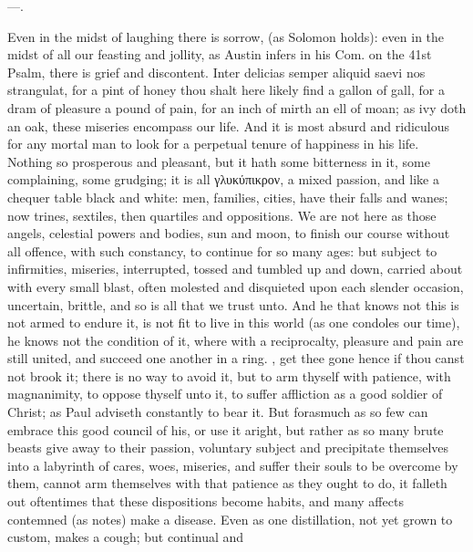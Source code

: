 {---.

Even in the midst of laughing there is sorrow, (as Solomon holds):
even in the midst of all our feasting and jollity, as Austin
infers in his Com. on the 41st Psalm, there is grief and discontent.
Inter delicias semper aliquid saevi nos strangulat, for a pint of honey
thou shalt here likely find a gallon of gall, for a dram of pleasure a
pound of pain, for an inch of mirth an ell of moan; as ivy doth an oak,
these miseries encompass our life. And it is most absurd and ridiculous
for any mortal man to look for a perpetual tenure of happiness in his
life. Nothing so prosperous and pleasant, but it hath some
bitterness in it, some complaining, some grudging; it is all
\textgreek{γλυκύπικρον}, a mixed passion, and like a chequer table black and white:
men, families, cities, have their falls and wanes; now trines,
sextiles, then quartiles and oppositions. We are not here as those
angels, celestial powers and bodies, sun and moon, to finish our course
without all offence, with such constancy, to continue for so many ages:
but subject to infirmities, miseries, interrupted, tossed and tumbled
up and down, carried about with every small blast, often molested and
disquieted upon each slender occasion, uncertain, brittle, and so
is all that we trust unto.  And he that knows not this is not
armed to endure it, is not fit to live in this world (as one condoles
our time), he knows not the condition of it, where with a reciprocalty,
pleasure and pain are still united, and succeed one another in a ring.
, get thee gone hence if thou canst not brook it; there is
no way to avoid it, but to arm thyself with patience, with magnanimity,
to oppose thyself unto it, to suffer affliction as a good soldier
of Christ; as Paul adviseth constantly to bear it. But forasmuch
as so few can embrace this good council of his, or use it aright, but
rather as so many brute beasts give away to their passion, voluntary
subject and precipitate themselves into a labyrinth of cares, woes,
miseries, and suffer their souls to be overcome by them, cannot arm
themselves with that patience as they ought to do, it falleth out
oftentimes that these dispositions become habits, and many affects
contemned (as \Seneca notes) make a disease. Even as one
distillation, not yet grown to custom, makes a cough; but continual and
}
